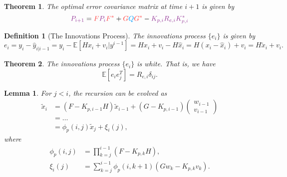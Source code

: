 \documentclass[a4 paper]{article}
\numberwithin{equation}{section}
\theoremstyle{boldStyle}
\theoremstyle{boldBlueStyle}
\newtheorem{lemma}{Lemma}[section]
\theoremstyle{boldPurpleStyle}
\newtheorem{theorem}{Theorem}[section]
\theoremstyle{boldRedStyle}
\newtheorem{definition}{Definition}[section]
\theoremstyle{boldGreenStyle}
\begin{document}
\begin{theorem}
  The optimal error covariance matrix at time \(i+1\) is given by
  \[
    \tpur{P_{i+1}} = \tred{F}\tpur{P_i}\tred{F^*} + \tred{G}\tblu{Q}\tred{G^*} - \tpur{K_{p,i} R_{e,i} K_{p,i}^*}
  \]
\end{theorem}


\begin{definition}[The Innovations Process]
  The innovations process \( \{e_i\} \) is given by
  \[
  e_i = y_i - \hat{y}_{i|i-1} = y_i - \mathbb{E}[H x_i + v_i | y^{i-1}] = H x_i + v_i - H \hat{x}_i = H (x_i - \hat{x}_i) + v_i = H \tilde{x}_i + v_i.
  \]
\end{definition}


\begin{theorem}
  The innovations process \( \{e_i\} \) is white. That is, we have
  \[
  \mathbb{E}[e_i e_j^T] = R_{e,i} \delta_{ij}.
  \]
\end{theorem}


\begin{lemma}
  For \( j < i \), the recursion can be evolved as
  \begin{align*}
      \tilde{x}_i &= (F - K_{p,i-1}H) \tilde{x}_{i-1} + (G - K_{p,i-1})
      \begin{pmatrix}
          w_{i-1} \\
          v_{i-1}
      \end{pmatrix} \\
      &= \ldots \\
      &= \phi_p(i, j) \tilde{x}_j + \xi_i(j),
  \end{align*}
  where
  \begin{align*}
      \phi_p(i, j) &= \prod_{k=j}^{i-1} (F - K_{p,k}H), \\
      \xi_i(j) &= \sum_{k=j}^{i-1} \phi_p(i, k+1) (G w_k - K_{p,k} v_k).
  \end{align*}
  \end{lemma}  
















\newpage
\end{document}
